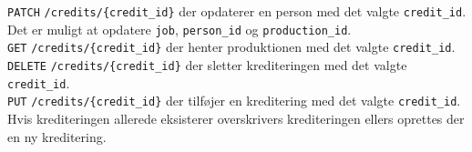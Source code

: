 \texttt{PATCH} \texttt{/credits/\{credit\_id\}} der opdaterer en person med det valgte \texttt{credit\_id}. Det er muligt at opdatere \texttt{job}, \texttt{person\_id} og \texttt{production\_id}.\\


\texttt{GET} \texttt{/credits/\{credit\_id\}} der henter produktionen med det valgte \texttt{credit\_id}.\\


\texttt{DELETE} \texttt{/credits/\{credit\_id\}} der sletter krediteringen med det valgte \texttt{credit\_id}.\\


\texttt{PUT} \texttt{/credits/\{credit\_id\}} der tilføjer en kreditering med det valgte \texttt{credit\_id}. Hvis krediteringen allerede eksisterer overskrivers krediteringen ellers oprettes der en ny kreditering.\\